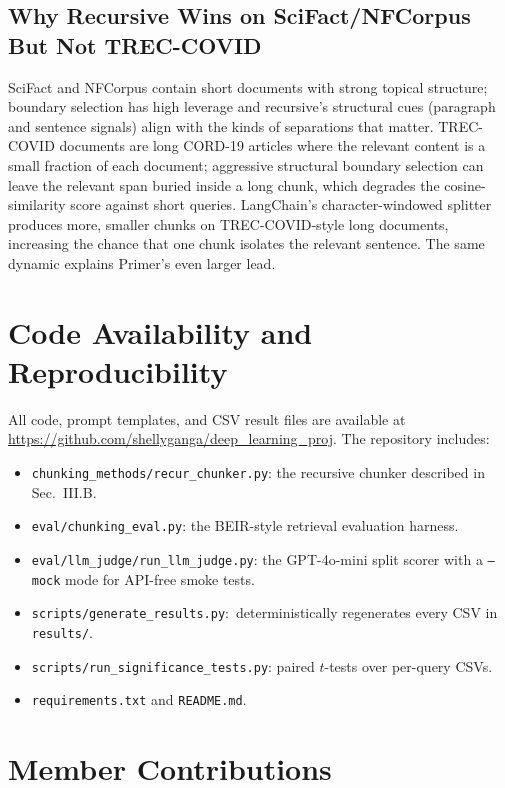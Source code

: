 \documentclass[conference]{IEEEtran}
\begin{document}
\subsection{Why Recursive Wins on SciFact/NFCorpus But Not TREC-COVID}

SciFact and NFCorpus contain short documents with strong topical structure;
boundary selection has high leverage and recursive's structural cues
(paragraph and sentence signals) align with the kinds of separations that
matter. TREC-COVID documents are long CORD-19 articles where the relevant
content is a small fraction of each document; aggressive structural
boundary selection can leave the relevant span buried inside a long chunk,
which degrades the cosine-similarity score against short queries.
LangChain's character-windowed splitter produces more, smaller chunks on
TREC-COVID-style long documents, increasing the chance that one chunk
isolates the relevant sentence. The same dynamic explains Primer's even
larger lead.

\section{Code Availability and Reproducibility}

All code, prompt templates, and CSV result files are available at
\url{https://github.com/shellyganga/deep_learning_proj}. The repository
includes:
\begin{itemize}
    \item \texttt{chunking\_methods/recur\_chunker.py}: the recursive chunker
    described in Sec.~III.B.
    \item \texttt{eval/chunking\_eval.py}: the BEIR-style retrieval evaluation
    harness.
    \item \texttt{eval/llm\_judge/run\_llm\_judge.py}: the GPT-4o-mini split
    scorer with a \texttt{--mock} mode for API-free smoke tests.
    \item \texttt{scripts/generate\_results.py}:\ deterministically
    regenerates every CSV in \texttt{results/}.
    \item \texttt{scripts/run\_significance\_tests.py}: paired $t$-tests over
    per-query CSVs.
    \item \texttt{requirements.txt} and \texttt{README.md}.
\end{itemize}

\section{Member Contributions}
\end{document}
